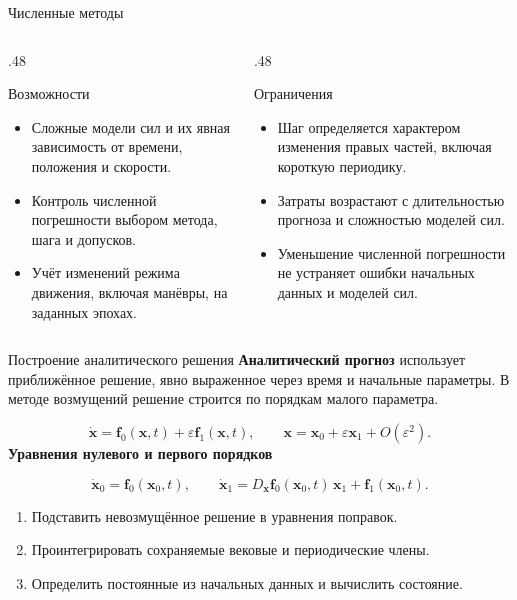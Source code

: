 \documentclass[11pt,aspectratio=169,t]{beamer}
\begin{document}
\begin{frame}{Численные методы}
\begin{columns}[T,onlytextwidth]
\begin{column}{.48\textwidth}
\begin{block}{Возможности}
\begin{itemize}\setlength{\itemsep}{4pt}
\item Сложные модели сил и их явная зависимость от времени, положения и скорости.
\item Контроль численной погрешности выбором метода, шага и допусков.
\item Учёт изменений режима движения, включая манёвры, на заданных эпохах.
\end{itemize}
\end{block}
\end{column}
\begin{column}{.48\textwidth}
\begin{block}{Ограничения}
\begin{itemize}\setlength{\itemsep}{4pt}
\item Шаг определяется характером изменения правых частей, включая короткую периодику.
\item Затраты возрастают с длительностью прогноза и сложностью моделей сил.
\item Уменьшение численной погрешности не устраняет ошибки начальных данных и моделей сил.
\end{itemize}
\end{block}
\end{column}
\end{columns}
\end{frame}

\begin{frame}{Построение аналитического решения}
\setlength{\abovedisplayskip}{3pt}\setlength{\belowdisplayskip}{3pt}
\justifying
\textbf{Аналитический прогноз} использует приближённое решение, явно выраженное через время и начальные параметры. В методе возмущений решение строится по порядкам малого параметра.\par
\[
\dot{\mathbf x}=\mathbf f_0(\mathbf x,t)+\varepsilon\mathbf f_1(\mathbf x,t),
\qquad \mathbf x=\mathbf x_0+\varepsilon\mathbf x_1+O(\varepsilon^2).
\]
\textbf{Уравнения нулевого и первого порядков}\par
\[
\dot{\mathbf x}_0=\mathbf f_0(\mathbf x_0,t),\qquad
\dot{\mathbf x}_1=D_{\mathbf x}\mathbf f_0(\mathbf x_0,t)\,\mathbf x_1
+\mathbf f_1(\mathbf x_0,t).
\]
\begin{enumerate}\setlength{\itemsep}{2pt}
\item Подставить невозмущённое решение в уравнения поправок.
\item Проинтегрировать сохраняемые вековые и периодические члены.
\item Определить постоянные из начальных данных и вычислить состояние.
\end{enumerate}
\end{frame}
\end{document}
